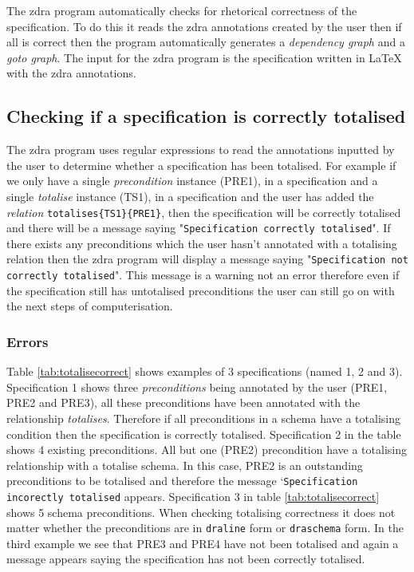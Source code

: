 The \gls{zdra} program automatically checks for rhetorical correctness of the specification. To do this it reads the \gls{zdra} annotations created by the user then if all is correct then the program automatically generates a \emph{dependency graph} and a \emph{goto graph}. The input for the \gls{zdra} program is the specification written in \LaTeX{} with the \gls{zdra} annotations.

\subsection{Checking if a specification is correctly totalised}

The \gls{zdra} program uses regular expressions to read the annotations inputted by the user to determine whether a specification has been totalised. For example if we only have a single \emph{precondition} instance (PRE1), in a specification and a single \emph{totalise} instance (TS1), in a specification and the user has added the \emph{relation} \verb|totalises{TS1}{PRE1}|, then the specification will be correctly totalised and there will be a message saying "\texttt{Specification correctly totalised}". If there exists any preconditions which the user hasn't annotated with a totalising relation then the \gls{zdra} program will display a message saying "\texttt{Specification not correctly totalised}". This message is a warning not an error therefore even if the specification still has untotalised preconditions the user can still go on with the next steps of computerisation.

\subsubsection{Errors}
\label{subsubsec:zdra_toterrors}

Table \ref{tab:totalisecorrect} shows examples of 3 specifications (named 1, 2 and 3). Specification 1 shows three \emph{preconditions} being annotated by the user (PRE1, PRE2 and PRE3), all these preconditions have been annotated with the relationship \emph{totalises}. Therefore if all preconditions in a schema have a totalising condition then the specification is correctly totalised. Specification 2 in the table shows 4 existing preconditions. All but one (PRE2) precondition have a totalising relationship with a totalise schema. In this case, PRE2 is an outstanding preconditions to be totalised and therefore the message `\texttt{Specification incorectly totalised} appears. Specification 3 in table \ref{tab:totalisecorrect} shows 5 schema preconditions. When checking totalising correctness it does not matter whether the preconditions are in \verb|draline| form or \verb|draschema| form. In the third example we see that PRE3 and PRE4 have not been totalised and again a message appears saying the specification has not been correctly totalised.

